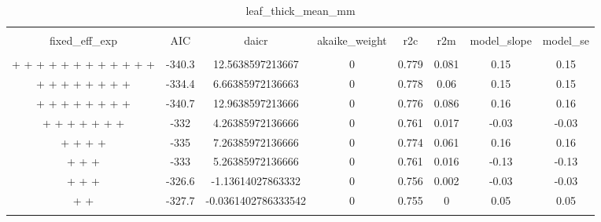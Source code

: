 
\begin{table}[!htbp] \centering 
  \caption{leaf_thick_mean_mm} 
  \label{leaf_thick_mean_mm} 
\begin{tabular}{@{\extracolsep{5pt}} cccccccc} 
\\[-1.8ex]\hline 
\hline \\[-1.8ex] 
fixed\_eff\_exp & AIC & daicr & akaike\_weight & r2c & r2m & model\_slope & model\_se \\ 
\hline \\[-1.8ex] 
 +  +  +  +  +  +  +  +  +  +  +  +  & -340.3 & 12.5638597213667 & 0 & 0.779 & 0.081 & 0.15 & 0.15 \\ 
 +  +  +  +  +  +  +  +  & -334.4 & 6.66385972136663 & 0 & 0.778 & 0.06 & 0.15 & 0.15 \\ 
 +  +  +  +  +  +  +  +  & -340.7 & 12.9638597213666 & 0 & 0.776 & 0.086 & 0.16 & 0.16 \\ 
 +  +  +  +  +  +  +  & -332 & 4.26385972136666 & 0 & 0.761 & 0.017 & -0.03 & -0.03 \\ 
 +  +  +  +  & -335 & 7.26385972136666 & 0 & 0.774 & 0.061 & 0.16 & 0.16 \\ 
 +  +  +  & -333 & 5.26385972136666 & 0 & 0.761 & 0.016 & -0.13 & -0.13 \\ 
 +  +  +  & -326.6 & -1.13614027863332 & 0 & 0.756 & 0.002 & -0.03 & -0.03 \\ 
 +  +  & -327.7 & -0.0361402786333542 & 0 & 0.755 & 0 & 0.05 & 0.05 \\ 
\hline \\[-1.8ex] 
\end{tabular} 
\end{table} 

